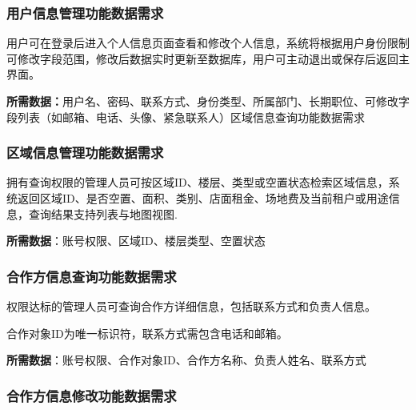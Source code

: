 \documentclass[]{article}
\begin{document}
\hypertarget{ux7528ux6237ux4fe1ux606fux7ba1ux7406ux529fux80fdux6570ux636eux9700ux6c42}{%
\subsubsection{用户信息管理功能数据需求}\label{ux7528ux6237ux4fe1ux606fux7ba1ux7406ux529fux80fdux6570ux636eux9700ux6c42}}

用户可在登录后进入个人信息页面查看和修改个人信息，系统将根据用户身份限制可修改字段范围，修改后数据实时更新至数据库，用户可主动退出或保存后返回主界面。

\textbf{所需数据：}用户名、密码、联系方式、身份类型、所属部门、长期职位、可修改字段列表（如邮箱、电话、头像、紧急联系人）区域信息查询功能数据需求

\hypertarget{ux533aux57dfux4fe1ux606fux7ba1ux7406ux529fux80fdux6570ux636eux9700ux6c42}{%
\subsubsection{区域信息管理功能数据需求}\label{ux533aux57dfux4fe1ux606fux7ba1ux7406ux529fux80fdux6570ux636eux9700ux6c42}}

拥有查询权限的管理人员可按区域ID、楼层、类型或空置状态检索区域信息，系统返回区域ID、是否空置、面积、类别、店面租金、场地费及当前租户或用途信息，查询结果支持列表与地图视图.

\textbf{所需数据}：账号权限、区域ID、楼层类型、空置状态

\hypertarget{ux5408ux4f5cux65b9ux4fe1ux606fux67e5ux8be2ux529fux80fdux6570ux636eux9700ux6c42}{%
\subsubsection{合作方信息查询功能数据需求}\label{ux5408ux4f5cux65b9ux4fe1ux606fux67e5ux8be2ux529fux80fdux6570ux636eux9700ux6c42}}

权限达标的管理人员可查询合作方详细信息，包括联系方式和负责人信息。

合作对象ID为唯一标识符，联系方式需包含电话和邮箱。

\textbf{所需数据}：账号权限、合作对象ID、合作方名称、负责人姓名、联系方式

\hypertarget{ux5408ux4f5cux65b9ux4fe1ux606fux4feeux6539ux529fux80fdux6570ux636eux9700ux6c42}{%
\subsubsection{合作方信息修改功能数据需求}\label{ux5408ux4f5cux65b9ux4fe1ux606fux4feeux6539ux529fux80fdux6570ux636eux9700ux6c42}}
\end{document}

